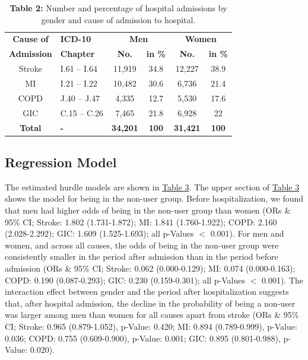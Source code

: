 
\begin{table}[htbp]
  \centering
  \caption*{\textbf{Table 2:} 	Number and percentage of hospital admissions by 
  								gender and cause of admission to hospital.}
 \begin{tabular}{cp{7.57em}cccc}
    \toprule
    \textbf{Cause of } & \textbf{ICD-10} & \multicolumn{2}{c}{\textbf{Men }} & \multicolumn{2}{c}{\textbf{Women }} \\
    \textbf{Admission} & \textbf{Chapter} & \textbf{No.} & \textbf{in \%} & \textbf{No. } & \textbf{in \%} \\
    \midrule
    Stroke  & I.61 -- I.64 & 11,919 & 34.8  & 12,227 & 38.9 \\
    MI    & I.21 -- I.22 & 10,482 & 30.6  & 6,736 & 21.4 \\
    COPD  & J.40 -- J.47 & 4,335 & 12.7  & 5,530 & 17.6 \\
    GIC   & C.15 -- C.26 & 7,465 & 21.8  & 6,928 & 22 \\
    \midrule
    \textbf{Total} & \textbf{-} & \textbf{34,201} & \textbf{100} & \textbf{31,421} & \textbf{100} \\
    \bottomrule
    \end{tabular}%
\label{ch3:tab2}
\end{table}%



\subsection{Regression Model}
The estimated hurdle models are shown in \hyperref[ch3:tab3]{Table 3}. The upper 
section of \hyperref[ch3:tab3]{Table 3} shows the model for being in the non-user 
group. Before hospitalization, we found that men had higher odds of being in the 
non-user group than women (ORs \& 95\% CI; Stroke: 1.802 (1.731-1.872); MI: 1.841 
(1.760-1.922); COPD: 2.160 (2.028-2.292); GIC: 1.609 (1.525-1.693); all p-Values 
$<$ 0.001). For men and women, and across all causes, the odds of being in the 
non-user group were consistently smaller in the period after admission than in 
the period before admission (ORs \& 95\% CI; Stroke: 0.062 (0.000-0.129); MI: 
0.074 (0.000-0.163); COPD: 0.190 (0.087-0.293); GIC: 0.230 (0.159-0.301); all 
p-Values $<$ 0.001). The interaction effect between gender and the period after 
hospitalization suggests that, after hospital admission, the decline in the probability 
of being a non-user was larger among men than women for all causes apart from 
stroke (ORs \& 95\% CI; Stroke: 0.965 (0.879-1.052), p-Value: 0.420; MI: 0.894 
(0.789-0.999), p-Value: 0.036; COPD: 0.755 (0.609-0.900), p-Value: 0.001; GIC: 
0.895 (0.801-0.988), p-Value: 0.020).

